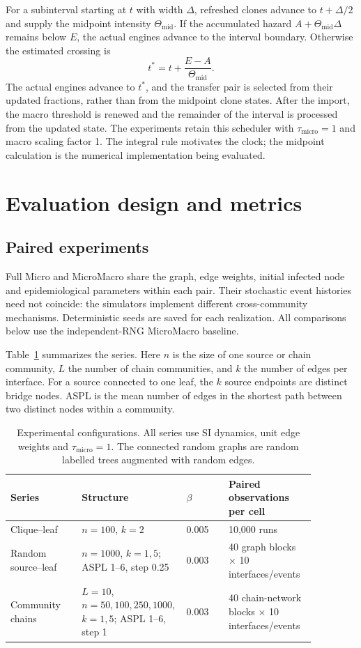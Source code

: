 \documentclass[a4paper,fleqn]{cas-sc}
\begin{document}
For a subinterval starting at $t$ with width $\Delta$, refreshed clones advance to $t+\Delta/2$ and supply the midpoint intensity $\Theta_{\mathrm{mid}}$. If the accumulated hazard $A+\Theta_{\mathrm{mid}}\Delta$ remains below $E$, the actual engines advance to the interval boundary. Otherwise the estimated crossing is
\[
t^\ast=t+\frac{E-A}{\Theta_{\mathrm{mid}}}.
\]
The actual engines advance to $t^\ast$, and the transfer pair is selected from their updated fractions, rather than from the midpoint clone states. After the import, the macro threshold is renewed and the remainder of the interval is processed from the updated state. The experiments retain this scheduler with $\tau_{\mathrm{micro}}=1$ and macro scaling factor 1. The integral rule motivates the clock; the midpoint calculation is the numerical implementation being evaluated.

\section{Evaluation design and metrics}
\label{sec:evaluation}

\subsection{Paired experiments}

Full Micro and MicroMacro share the graph, edge weights, initial infected node and epidemiological parameters within each pair. Their stochastic event histories need not coincide: the simulators implement different cross-community mechanisms. Deterministic seeds are saved for each realization. All comparisons below use the independent-RNG MicroMacro baseline.

Table~\ref{tab:experimental_design} summarizes the series. Here $n$ is the size of one source or chain community, $L$ the number of chain communities, and $k$ the number of edges per interface. For a source connected to one leaf, the $k$ source endpoints are distinct bridge nodes. ASPL is the mean number of edges in the shortest path between two distinct nodes within a community.

\begin{table}[tbp]
\centering
\caption{Experimental configurations. All series use SI dynamics, unit edge weights and $\tau_{\mathrm{micro}}=1$. The connected random graphs are random labelled trees augmented with random edges.}
\label{tab:experimental_design}
\small
\begin{tabular}{p{0.22\linewidth}p{0.25\linewidth}p{0.13\linewidth}p{0.27\linewidth}}
\toprule
Series & Structure & $\beta$ & Paired observations per cell\\
\midrule
Clique--leaf & $n=100$, $k=2$ & 0.005 & 10,000 runs\\
Random source--leaf & $n=1000$, $k=1,5$; ASPL 1--6, step 0.25 & 0.003 & 40 graph blocks $\times$ 10 interfaces/events\\
Community chains & $L=10$, $n=50,100,250,1000$, $k=1,5$; ASPL 1--6, step 1 & 0.003 & 40 chain-network blocks $\times$ 10 interfaces/events\\
\bottomrule
\end{tabular}
\end{table}
\end{document}
